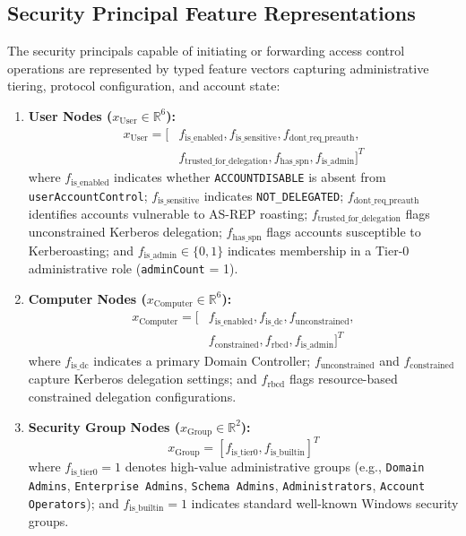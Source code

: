 \subsection{Security Principal Feature Representations}
The security principals capable of initiating or forwarding access control operations are represented by typed feature vectors capturing administrative tiering, protocol configuration, and account state:

\begin{enumerate}
    \item \textbf{User Nodes ($x_{\text{User}} \in \mathbb{R}^6$):}
    \begin{equation}
    \begin{aligned}
    x_{\text{User}} = [ & f_{\text{is\_enabled}}, f_{\text{is\_sensitive}}, f_{\text{dont\_req\_preauth}}, \\
    & f_{\text{trusted\_for\_delegation}}, f_{\text{has\_spn}}, f_{\text{is\_admin}} ]^T
    \end{aligned}
    \end{equation}
    where $f_{\text{is\_enabled}}$ indicates whether \texttt{ACCOUNTDISABLE} is absent from \texttt{userAccountControl}; $f_{\text{is\_sensitive}}$ indicates \texttt{NOT\_DELEGATED}; $f_{\text{dont\_req\_preauth}}$ identifies accounts vulnerable to AS-REP roasting; $f_{\text{trusted\_for\_delegation}}$ flags unconstrained Kerberos delegation; $f_{\text{has\_spn}}$ flags accounts susceptible to Kerberoasting; and $f_{\text{is\_admin}} \in \{0, 1\}$ indicates membership in a Tier-0 administrative role (\texttt{adminCount} = 1).
    
    \item \textbf{Computer Nodes ($x_{\text{Computer}} \in \mathbb{R}^6$):}
    \begin{equation}
    \begin{aligned}
    x_{\text{Computer}} = [ & f_{\text{is\_enabled}}, f_{\text{is\_dc}}, f_{\text{unconstrained}}, \\
    & f_{\text{constrained}}, f_{\text{rbcd}}, f_{\text{is\_admin}} ]^T
    \end{aligned}
    \end{equation}
    where $f_{\text{is\_dc}}$ indicates a primary Domain Controller; $f_{\text{unconstrained}}$ and $f_{\text{constrained}}$ capture Kerberos delegation settings; and $f_{\text{rbcd}}$ flags resource-based constrained delegation configurations.
    
    \item \textbf{Security Group Nodes ($x_{\text{Group}} \in \mathbb{R}^2$):}
    \begin{equation}
    x_{\text{Group}} = [f_{\text{is\_tier0}}, f_{\text{is\_builtin}}]^T
    \end{equation}
    where $f_{\text{is\_tier0}} = 1$ denotes high-value administrative groups (e.g., \texttt{Domain Admins}, \texttt{Enterprise Admins}, \texttt{Schema Admins}, \texttt{Administrators}, \texttt{Account Operators}); and $f_{\text{is\_builtin}} = 1$ indicates standard well-known Windows security groups.
    

\end{enumerate}
